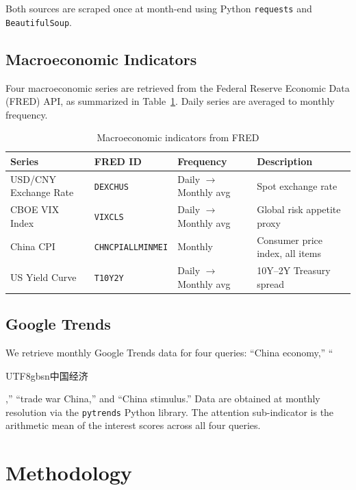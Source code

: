 \documentclass[11pt]{article}
\begin{document}
Both sources are scraped once at month-end using Python
\texttt{requests} and \texttt{BeautifulSoup}.

\subsection{Macroeconomic Indicators}\label{sec:data:macro}

Four macroeconomic series are retrieved from the Federal Reserve
Economic Data (FRED) API, as summarized in Table~\ref{tab:fred}.
Daily series are averaged to monthly frequency.

\begin{table}[H]
\centering
\caption{Macroeconomic indicators from FRED}
\label{tab:fred}
\begin{tabular}{@{}llll@{}}
\toprule
Series & FRED ID & Frequency & Description \\
\midrule
USD/CNY Exchange Rate & \texttt{DEXCHUS} & Daily $\to$ Monthly avg
  & Spot exchange rate \\
CBOE VIX Index & \texttt{VIXCLS} & Daily $\to$ Monthly avg
  & Global risk appetite proxy \\
China CPI & \texttt{CHNCPIALLMINMEI} & Monthly
  & Consumer price index, all items \\
US Yield Curve & \texttt{T10Y2Y} & Daily $\to$ Monthly avg
  & 10Y--2Y Treasury spread \\
\bottomrule
\end{tabular}
\end{table}

\subsection{Google Trends}\label{sec:data:gtrends}

We retrieve monthly Google Trends data for four queries: ``China
economy,'' ``\begin{CJK}{UTF8}{gbsn}中国经济\end{CJK},'' ``trade war
China,'' and ``China stimulus.''  Data are obtained at monthly
resolution via the \texttt{pytrends} Python library.  The attention
sub-indicator is the arithmetic mean of the interest scores across all
four queries.

\section{Methodology}\label{sec:method}
\end{document}
